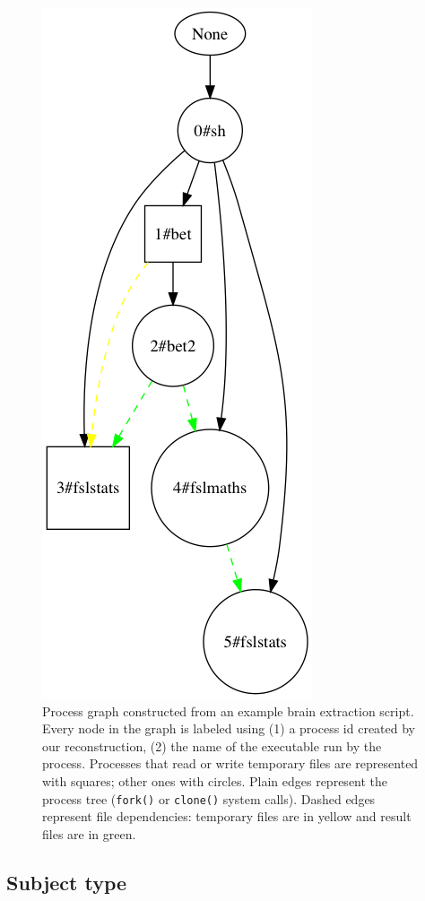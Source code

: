 \documentclass[a4paper,num-refs]{oup-contemporary}
\begin{document}
\begin{figure}
\centering
  \includegraphics[scale=0.3]{images/simple_graph}
  \caption{Process graph constructed from an example brain extraction
	script. Every node in the graph is labeled using (1) a process id 
	created by our reconstruction, (2) the name of the executable run 
	by the process. Processes that read or write temporary files are 
	represented with squares; other ones with circles. Plain edges 
	represent the process tree (\texttt{fork()} or \texttt{clone()} 
	system calls). Dashed edges represent file dependencies: temporary 
	files are in yellow and result files are in green.}
  \label{fig:simple_script}
\end{figure}

\subsection{Subject type}
\end{document}

